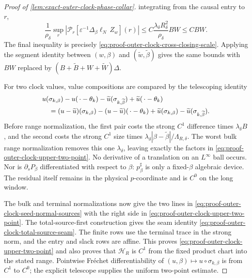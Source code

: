 \begin{proof}[Proof of
\cref{lem:exact-outer-clock-phase-collar}]
integrating from the causal entry to \(r\),
\begin{equation}
 \frac1{\rho_\delta}
 \sup_r\left|\mathcal P_r
   [\varepsilon^{-1}\Delta_\beta\ell_N\,Z_w](r)\right|
 \le C\frac{\lambda_\delta R_\delta^2}{\rho_\delta}BW
 \le CBW.                                      \label{eq:proof-outer-clock-hostile-prefix-cross}
\end{equation}
The final inequality is precisely
\cref{eq:proof-outer-clock-cross-closing-scale}.  Applying the segment
identity between \((w,\beta)\) and
\((\widetilde w,\widetilde\beta)\) gives the same bounds with
\(BW\) replaced by
\((B+\widetilde B+W+\widetilde W)\Delta\).

For two clock values, value compositions are compared by the telescoping
identity
\begin{align}
 &u(\sigma_{k,\beta})-u(\,\cdot-\theta_k)
 -\widetilde u(\sigma_{k,\widetilde\beta})
 +\widetilde u(\,\cdot-\theta_k)\notag\\
 &\quad=
 (u-\widetilde u)(\sigma_{k,\beta})
 -(u-\widetilde u)(\,\cdot-\theta_k)
 +\widetilde u(\sigma_{k,\beta})
 -\widetilde u(\sigma_{k,\widetilde\beta}).     \label{eq:proof-outer-clock-composition-telescope}
\end{align}
Before range normalization, the first pair costs the strong \(C^1\)
difference times \(\lambda_\delta B\), and the second costs the strong
\(C^1\) size times
\(\lambda_\delta|\beta-\widetilde\beta|/\Lambda_{R,\delta}\).
The worst bulk range normalization removes this one
\(\lambda_\delta\), leaving exactly the factors in
\cref{eq:proof-outer-clock-upper-two-point}.
No derivative of a translation on an \(L^\infty\) ball occurs.  Nor is
\(\partial_sP_\beta\) differentiated with respect to \(\beta\):
\(p_\beta^\sharp\) is only a fixed-\(\beta\) algebraic device.  The
residual itself remains in the physical \(p\)-coordinate and is
\(C^0\) on the long window.

The bulk and terminal normalizations now give the two lines in
\cref{eq:proof-outer-clock-seed-normal-sources} with the right side in
\cref{eq:proof-outer-clock-upper-two-point}.  The total-source-first
construction gives the seam identity
\cref{eq:proof-outer-clock-total-source-seam}.  The finite rows use the
terminal trace in the strong norm, and the entry and slack rows are
affine.  This proves
\cref{eq:proof-outer-clock-upper-two-point} and also proves that
\(\mathcal H_R\) is \(C^1\) from the fixed product chart into the stated
range.  Pointwise Fr\'echet differentiability of
\((u,\beta)\mapsto u\circ\sigma_{k,\beta}\) is from \(C^1\) to \(C^0\);
the explicit telescope supplies the uniform two-point estimate.


\end{proof}
